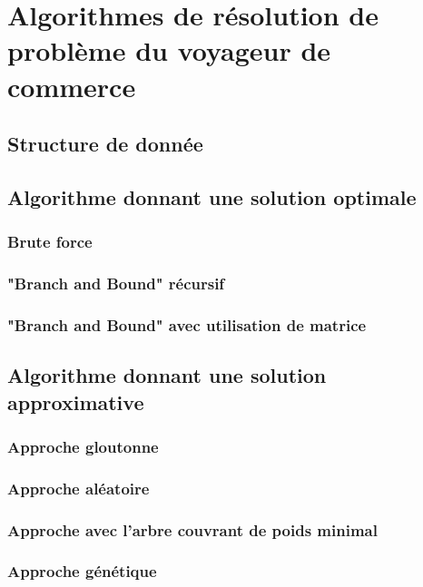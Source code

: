 \documentclass[10pt,a4paper]{report}
\begin{document}
\section{Algorithmes de résolution de problème du voyageur de commerce}

	\subsection{Structure de donnée}
	
	\subsection{Algorithme donnant une solution optimale}
		\subsubsection{Brute force}
		
		\subsubsection{"Branch and Bound" récursif}	
		
		\subsubsection{"Branch and Bound" avec utilisation de matrice}	
		
	\subsection{Algorithme donnant une solution approximative}
	
		\subsubsection{Approche gloutonne}
		
		\subsubsection{Approche aléatoire}
		
		\subsubsection{Approche avec l'arbre couvrant de poids minimal}
		
		\subsubsection{Approche génétique}
		
\end{document}
